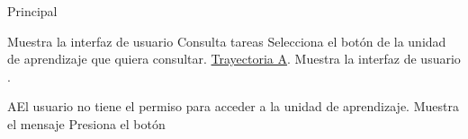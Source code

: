 \begin{UCtrayectoria}{Principal}


    \UCpaso Muestra la interfaz de usuario Consulta tareas  %
    \UCpaso [\UCactor] Selecciona el botón  de la unidad de aprendizaje que quiera consultar. \hyperref[SP2-CU1-A]{Trayectoria A}.
    \UCpaso  Muestra la interfaz de usuario .

\end{UCtrayectoria}


\label{SP2-CU1-A}
\begin{UCtrayectoriaA}{A}{El usuario no tiene el permiso para acceder a la unidad de aprendizaje.}
    \UCpaso Muestra el mensaje 
    \UCpaso[\UCactor] Presiona el botón 
\end{UCtrayectoriaA}

